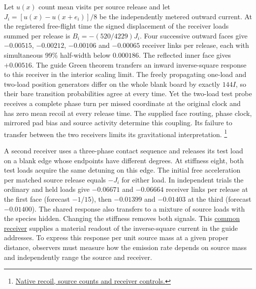\documentclass[11pt]{article}
\begin{document}
Let $u(x)$ count mean visits per source release and let
$J_i=[u(x)-u(x+e_i)]/8$ be the independently metered outward
current. At the registered free-flight time the signed displacement of
the receiver loads summed per release is $B_i=-(520/4229)J_i$.
Four successive outward faces give $-0.00515$, $-0.00212$,
$-0.00106$ and $-0.00065$ receiver links per release, each with
simultaneous 99\% half-width below $0.000186$. The reflected inner
face gives $+0.00516$. The guide Green theorem transfers an inward
inverse-square response to this receiver in the interior scaling
limit. The freely propagating one-load and two-load position
generators differ on the whole blank board by exactly $144I$, so their
bare transition probabilities agree at every time. Yet the two-load
test probe receives a complete phase turn per missed coordinate at the
original clock and has zero mean recoil at every release time.
The supplied face routing, phase clock, mirrored pad bias and source
activity determine this coupling. Its failure to transfer between the
two receivers limits its gravitational interpretation.
\footnote{\href{https://github.com/FloatingPragma/observer-patch-holography/tree/main/model/experiments/interval_echo_shell_flux/product_address/green_response/material_recoil}{Native recoil, source counts and receiver controls.}}

A second receiver uses a three-phase contact sequence and releases its
test load on a blank edge whose endpoints have different degrees.
At stiffness eight, both test loads acquire the same detuning on this
edge. The initial free acceleration per matched source release equals
$-J_i$ for either load. In independent trials the ordinary and held
loads give $-0.06671$ and $-0.06664$ receiver links per release at the
first face (forecast $-1/15$), then $-0.01399$ and $-0.01403$ at the
third (forecast $-0.01400$). The shared response also transfers to
a mixture of source loads with the species hidden. Changing the
stiffness removes both signals. This
\href{https://github.com/FloatingPragma/observer-patch-holography/tree/main/model/experiments/interval_echo_shell_flux/product_address/green_response/material_recoil/common_receiver}{common receiver}
supplies a material readout of the inverse-square current in the guide
addresses. To express this response per unit source mass at a given
proper distance, observers must measure how the emission rate depends
on source mass and independently range the source and receiver.
\end{document}
